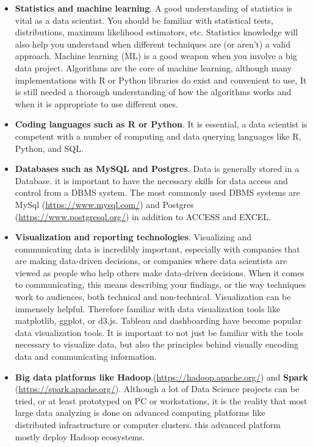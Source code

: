\documentclass[
]{book}
\providecommand{\tightlist}{%
  \setlength{\itemsep}{0pt}\setlength{\parskip}{0pt}}
\begin{document}
\begin{itemize}
\tightlist
\item
  \textbf{Statistics and machine learning}. A good understanding of statistics is vital as a data scientist. You should be familiar with statistical tests, distributions, maximum likelihood estimators, etc. Statistics knowledge will also help you understand when different techniques are (or aren't) a valid approach. Machine learning (ML) is a good weapon when you involve a big data project. Algorithms are the core of machine learning, although many implementations with R or Python libraries do exist and convenient to use, It is still needed a thorough understanding of how the algorithms works and when it is appropriate to use different ones.
\item
  \textbf{Coding languages such as R or Python}. It is essential, a data scientist is competent with a number of computing and data querying languages like R, Python, and SQL.
\item
  \textbf{Databases such as MySQL and Postgres}. Data is generally stored in a Database. it is important to have the necessary skills for data access and control from a DBMS system. The most commonly used DBMS systems are MySql (\url{https://www.mysql.com/}) and Postgres (\url{https://www.postgresql.org/}) in addition to ACCESS and EXCEL.
\item
  \textbf{Visualization and reporting technologies}. Visualizing and communicating data is incredibly important, especially with companies that are making data-driven decisions, or companies where data scientists are viewed as people who help others make data-driven decisions. When it comes to communicating, this means describing your findings, or the way techniques work to audiences, both technical and non-technical. Visualization can be immensely helpful. Therefore familiar with data visualization tools like matplotlib, ggplot, or d3.js. Tableau and dashboarding have become popular data visualization tools. It is important to not just be familiar with the tools necessary to visualize data, but also the principles behind visually encoding data and communicating information.
\item
  \textbf{Big data platforms like Hadoop}.(\url{https://hadoop.apache.org/}) and \textbf{Spark} (\url{https://spark.apache.org/}). Although a lot of Data Science projects can be tried, or at least prototyped on PC or workstations, it is the reality that most large data analyzing is done on advanced computing platforms like distributed infrastructure or computer clusters. this advanced platform mostly deploy Hadoop ecosystems.
\end{itemize}
\end{document}
